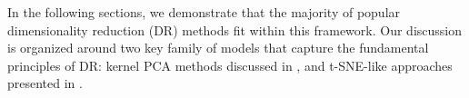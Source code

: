In the following sections, we demonstrate that the majority of popular dimensionality reduction (DR) methods fit within this framework. Our discussion is organized around two key family of models that capture the fundamental principles of DR: kernel PCA methods discussed in , and t-SNE-like approaches presented in .



